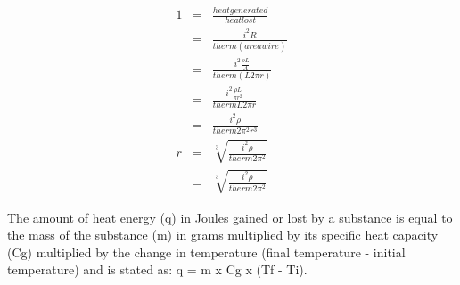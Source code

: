 \documentclass{article}
\begin{document}
\begin{eqnarray}
1 &=& \frac{heat generated}{heat lost} \\
 &=& \frac{i^2R}{therm  (area wire)} \\
 &=& \frac{i^2 \frac{\rho L}{A}}{therm (L2\pi r)} \\
 &=& \frac{i^2 \frac{\rho L}{\pi r^2}}{therm L2\pi r} \\
 &=& \frac{i^2\rho}{therm 2\pi^2 r^3} \\
r &=& \sqrt[3]{\frac{i^2\rho}{therm 2\pi^2}} \\
 &=& \sqrt[3]{\frac{i^2\rho}{therm 2\pi^2}}
\end{eqnarray}


 The amount of heat energy (q) in Joules gained or lost by a substance is equal to the mass of the substance (m) in grams multiplied by its specific heat capacity (Cg) multiplied by the change in temperature (final temperature - initial temperature) and is stated as: q = m x Cg x (Tf - Ti).
\end{document}
